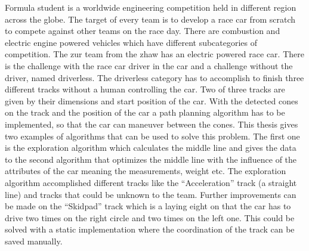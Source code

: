 Formula student is a worldwide engineering competition held in different region across the globe. The target of every team is to develop a race car from scratch to compete against other teams on the race day. There are combustion and electric engine powered vehicles which have different subcategories of competition. The \acrlong{zur} team from the \acrlong{zhaw} has an electric powered race car. There is the challenge with the race car driver in the car and a challenge without the driver, named driverless. The driverless category has to accomplish to finish three different tracks without a human controlling the car. Two of three tracks are given by their dimensions and start position of the car. With the detected cones on the track and the position of the car a path planning algorithm has to be implemented, so that the car can maneuver between the cones. This thesis gives two examples of algorithms that can be used to solve this problem. The first one is the exploration algorithm which calculates the middle line and gives the data to the second algorithm that optimizes the middle line with the influence of the attributes of the car meaning the measurements, weight etc. The exploration algorithm accomplished different tracks like the ``Acceleration'' track (a straight line) and tracks that could be unknown to the team. Further improvements can be made on the ``Skidpad'' track which is a laying eight on that the car has to drive two times on the right circle and two times on the left one. This could be solved with a static implementation where the coordination of the track can be saved manually.
